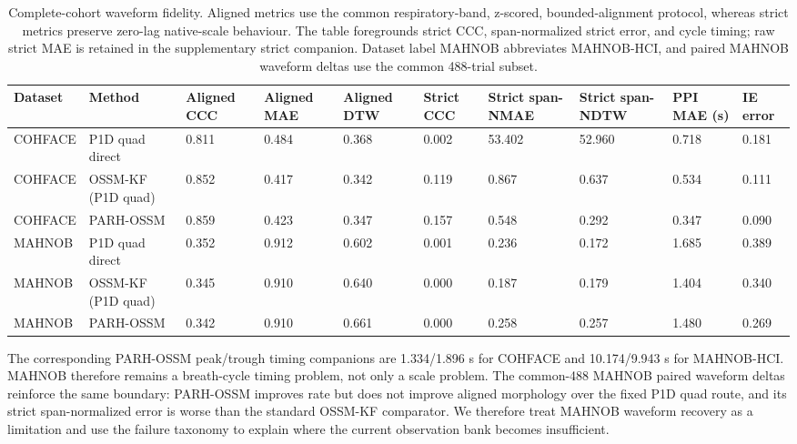 \documentclass[fleqn,10pt]{wlscirep}
\begin{document}
\begin{table}[H]
\centering
\caption{Complete-cohort waveform fidelity. Aligned metrics use the common
respiratory-band, z-scored, bounded-alignment protocol, whereas strict metrics
preserve zero-lag native-scale behaviour. The table foregrounds strict CCC,
span-normalized strict error, and cycle timing; raw strict MAE is retained in
the supplementary strict companion. Dataset label MAHNOB abbreviates
MAHNOB-HCI, and paired MAHNOB waveform deltas use the common 488-trial subset.}
\label{tab:cohface_t4}
\footnotesize
\setlength{\tabcolsep}{2pt}
\renewcommand{\arraystretch}{1.10}
\begin{tabular}{L{1.55cm}L{2.65cm}C{1.20cm}C{1.20cm}C{1.20cm}C{1.10cm}C{1.35cm}C{1.35cm}C{1.10cm}C{1.05cm}}
\toprule
Dataset & Method & Aligned CCC & Aligned MAE & Aligned DTW & Strict CCC & Strict span-NMAE & Strict span-NDTW & PPI MAE (s) & IE error \\
\midrule
COHFACE & P1D quad direct & 0.811 & 0.484 & 0.368 & 0.002 & 53.402 & 52.960 & 0.718 & 0.181 \\
COHFACE & OSSM-KF (P1D quad) & 0.852 & 0.417 & 0.342 & 0.119 & 0.867 & 0.637 & 0.534 & 0.111 \\
COHFACE & PARH-OSSM & 0.859 & 0.423 & 0.347 & 0.157 & 0.548 & 0.292 & 0.347 & 0.090 \\
MAHNOB & P1D quad direct & 0.352 & 0.912 & 0.602 & 0.001 & 0.236 & 0.172 & 1.685 & 0.389 \\
MAHNOB & OSSM-KF (P1D quad) & 0.345 & 0.910 & 0.640 & 0.000 & 0.187 & 0.179 & 1.404 & 0.340 \\
MAHNOB & PARH-OSSM & 0.342 & 0.910 & 0.661 & 0.000 & 0.258 & 0.257 & 1.480 & 0.269 \\
\bottomrule
\end{tabular}
\renewcommand{\arraystretch}{1.0}
\end{table}
\FloatBarrier
The corresponding PARH-OSSM peak/trough timing companions are 1.334/1.896 s for
COHFACE and 10.174/9.943 s for MAHNOB-HCI. MAHNOB therefore remains a
breath-cycle timing problem, not only a scale problem.
The common-488 MAHNOB paired waveform deltas reinforce the same boundary:
PARH-OSSM improves rate but does not improve aligned morphology over the fixed
P1D quad route, and its strict span-normalized error is worse than the standard
OSSM-KF comparator. We therefore treat MAHNOB waveform recovery
as a limitation and use the failure taxonomy to explain where the current
observation bank becomes insufficient.
\end{document}
